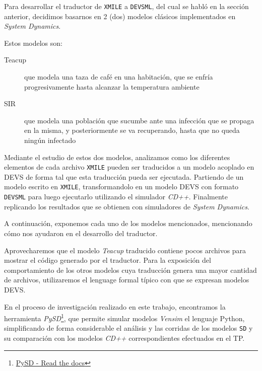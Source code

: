Para desarrollar el traductor de \texttt{XMILE} a \texttt{DEVSML}, del cual se habló en la sección anterior, decidimos basarnos en 2 (dos) modelos clásicos implementados en \textit{System Dynamics}. 

Estos modelos son: 
\begin{description}
	\item[Teacup] que modela una taza de café en una habitación, que se enfría progresivamente hasta alcanzar la temperatura ambiente
	\item[SIR] 	que modela una población que sucumbe ante una infección que se propaga en la misma, y posteriormente se va recuperando, hasta que no queda ningún infectado
\end{description}

Mediante el estudio de estos dos modelos, analizamos como los diferentes elementos de cada archivo \texttt{XMILE} pueden ser traducidos a un modelo acoplado en DEVS  de forma tal que esta traducción pueda ser ejecutada. 
Partiendo de un modelo escrito en \texttt{XMILE}, transformandolo en un modelo DEVS con formato \texttt{DEVSML} para luego ejecutarlo utilizando el simulador \textit{CD++}. Finalmente replicando los resultados que se obtienen con simuladores de \textit{System Dynamics}.


A continuación, exponemos cada uno de los modelos mencionados, mencionando cómo nos ayudaron en el desarrollo del traductor. 

Aprovecharemos que el modelo \textit{Teacup} traducido contiene pocos archivos para mostrar el código generado por el traductor. Para la exposición del comportamiento de los otros modelos cuya traducción genera una mayor cantidad de archivos, utilizaremos el lenguage formal típico con que se expresan modelos DEVS.

En el proceso de investigación realizado en este trabajo, encontramos la herramienta \textit{PySD}\footnote{\href{http://pysd.readthedocs.io/en/master/}{PySD - Read the docs}}, que permite simular modelos \textit{Vensim} el lenguaje Python, simplificando de forma considerable el análisis y las corridas de los modelos \texttt{SD} y su comparación con los modelos \textit{CD++} correspondientes efectuados en el TP.
